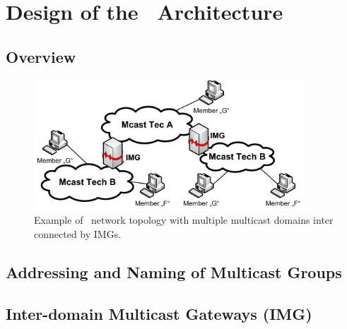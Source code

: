 \section{Design of the \hamcast\ Architecture}
\label{sec:design}

\subsection{Overview}

\begin{figure}[htp]
    \centering
    \includegraphics[width=0.9\textwidth]{figs/imgs}
    \caption{Example of \hamcast\ network topology with multiple multicast
domains inter connected by IMGs.}
    \label{fig:imgs}
\end{figure}


\subsection{Addressing and Naming of Multicast Groups}

\subsection{Inter-domain Multicast Gateways (IMG)}
